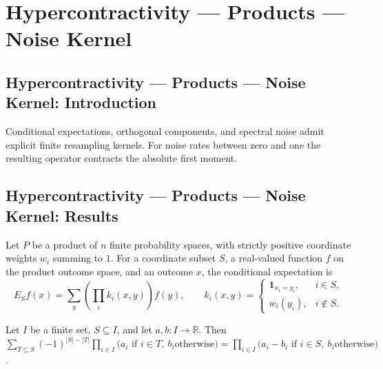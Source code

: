 \section{Hypercontractivity --- Products --- Noise Kernel}
\subsection*{Hypercontractivity --- Products --- Noise Kernel: Introduction}
Conditional expectations, orthogonal components, and spectral noise admit explicit finite resampling kernels. For noise rates between zero and one the resulting operator contracts the absolute first moment.

\subsection*{Hypercontractivity --- Products --- Noise Kernel: Results}

\begin{theorem}
\leanok
{}
Let $P$ be a product of $n$ finite probability spaces, with strictly positive coordinate
weights $w_i$ summing to $1$. For a coordinate subset $S$, a real-valued function $f$ on
the product outcome space, and an outcome $x$, the conditional expectation is
\[E_Sf(x)=\sum_y\left(\prod_i k_i(x,y)\right)f(y),\qquad k_i(x,y)=\begin{cases}\mathbf 1_{x_i=y_i},&i\in S,\\ w_i(y_i),&i\notin S.\end{cases}\]
\end{theorem}

\begin{theorem}
\leanok
{}
Let $I$ be a finite set, $S\subseteq I$, and let $a,b:I\to\mathbb R$. Then
$\sum_{T\subseteq S}(-1)^{|S|-|T|}\prod_{i\in I}\bigl(a_i\text{ if }i\in T,\ b_i\text{
otherwise}\bigr)=\prod_{i\in I}\bigl(a_i-b_i\text{ if }i\in S,\ b_i\text{
otherwise}\bigr)$.
\end{theorem}


